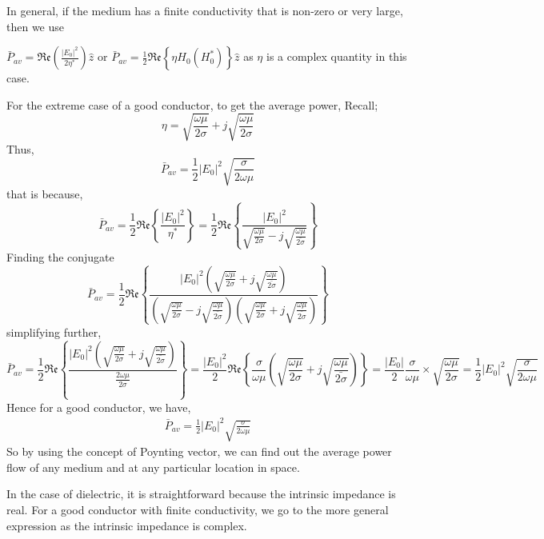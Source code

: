 In general, if the medium has a finite conductivity that is non-zero or very large, then we use

$ \bar{P}_{av}=\mathfrak{Re}(\frac{|E_0|^{2}}{2\eta^{*}})\hat{z} $ or  $ \bar{P}_{av}= \frac{1}{2}\mathfrak{Re}\left\{\eta H_0(H_0^{*})\right\}\hat{z} $ 
as $ \eta $ is a complex quantity in this case.

For the extreme case of a good conductor, to get the average power, Recall;
\begin{dmath*}
\eta=\sqrt{\frac{\omega\mu}{2\sigma}}+j\sqrt{\frac{\omega\mu}{{2\sigma}}}
\end{dmath*}
Thus,
\begin{dmath*}
\bar{P}_{av}=\frac{1}{2}|E_0|^{2}\sqrt{\frac{\sigma}{2\omega\mu}} 
\end{dmath*}
that is because,
\begin{dmath*}
\bar{P}_{av}=\frac{1}{2}\mathfrak{Re}\left\{\frac{|E_0|^{2}}{\eta^{*}}\right\}=\frac{1}{2}\mathfrak{Re}\left\{\frac{|E_0|^{2}}{\sqrt{\frac{\omega\mu}{2\sigma}}-j\sqrt{\frac{\omega\mu}{\bar{2\sigma}}}}\right\}
\end{dmath*}
Finding the conjugate
\begin{dmath*}
\bar{P}_{av}= \frac{1}{2}\mathfrak{Re}\left\{\frac{|E_0|^{2}\left(\sqrt{\frac{\omega\mu}{2\sigma}}+j\sqrt{\frac{\omega\mu}{\bar{2\sigma}}}\right)}{\left(\sqrt{\frac{\omega\mu}{2\sigma}}-j\sqrt{\frac{\omega\mu}{\bar{2\sigma}}}\right)\left(\sqrt{\frac{\omega\mu}{2\sigma}}+j\sqrt{\frac{\omega\mu}{\bar{2\sigma}}}\right)}\right\}
\end{dmath*}
simplifying further,
\begin{dmath*}
\bar{P}_{av}=\frac{1}{2}\mathfrak{Re}\left\{\frac{|E_0|^{2}(\sqrt{\frac{\omega\mu}{2\sigma}}+j\sqrt{\frac{\omega\mu}{\bar{2\sigma}}})}{\frac{2\omega\mu}{2\sigma}}\right\}
= \frac{|E_0|^{2}}{2}\mathfrak{Re}\left\{\frac{\sigma}{\omega\mu}\left(\sqrt{\frac{\omega\mu}{2\sigma}}+j\sqrt{\frac{\omega\mu}{\bar{2\sigma}}}\right) \right\}
=\frac{|E_0|}{2}\frac{\sigma}{\omega\mu}\times\sqrt{\frac{\omega\mu}{2\sigma}}=\frac{1}{2}|E_0|^{2}\sqrt{\frac{\sigma}{2\omega\mu}} 
\end{dmath*}
Hence for a good conductor, we have, 
\begin{align}
\bar{P}_{av}=\frac{1}{2}|E_0|^{2}\sqrt{\frac{\sigma}{2\omega\mu}} 
\end{align}
So by using the concept of Poynting vector, we can find out the average power flow of any medium and at any particular location in space.

In the case of dielectric, it is straightforward because the intrinsic impedance is real. For a good conductor with finite conductivity, we go to the more general expression as the intrinsic impedance is complex.
